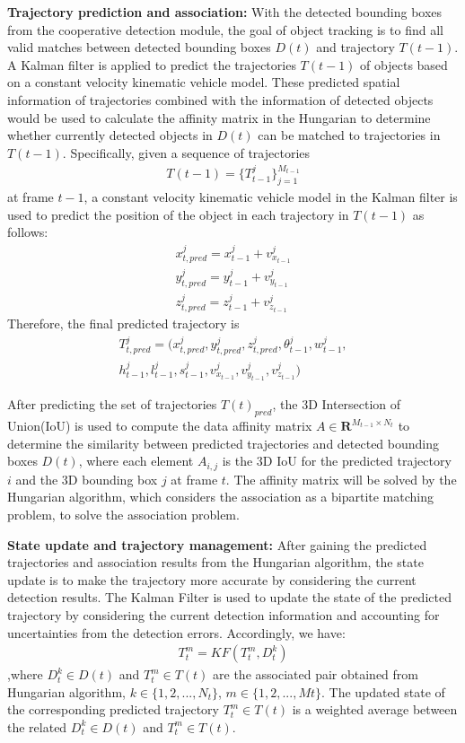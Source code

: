 \documentclass[10pt,twocolumn,letterpaper]{article}
\begin{document}
\textbf{Trajectory prediction and association:} With the detected bounding boxes from the cooperative detection module, the goal of object tracking is to find all valid matches between detected bounding boxes $D(t)$ and trajectory $T(t-1)$. A Kalman filter is applied to predict the trajectories $T(t-1)$ of objects based on a constant velocity kinematic vehicle model. These predicted spatial information of trajectories combined with the information of detected objects would be used to calculate the affinity matrix in the Hungarian to determine whether currently detected objects in $D(t)$ can be matched to trajectories in $T(t-1)$. Specifically, given a sequence of trajectories 
\begin{align}
T(t-1) = \{T_{t-1}^j\}_{j=1}^{M_{t-1}}
\end{align} 
at frame $t-1$, a constant velocity kinematic vehicle model in the Kalman filter is used to predict the position of the object in each trajectory in $T(t-1)$ as follows:
\begin{align}
x_{t,pred}^j = x_{t-1}^j + v_{x_{t-1}}^j \\
y_{t,pred}^j = y_{t-1}^j + v_{y_{t-1}}^j \\
z_{t,pred}^j = z_{t-1}^j + v_{z_{t-1}}^j
\end{align} 
Therefore, the final predicted trajectory is
\begin{align}
T_{t,pred}^j = (x_{t,pred}^j , y_{t,pred}^j , z_{t,pred}^j , \theta_{t-1}^j ,w_{t-1}^j,\\ h_{t-1}^j , l_{t-1}^j , s_{t-1}^j,v_{x_{t-1}}^j, v_{y_{t-1}}^j, v_{z_{t-1}}^j)
\end{align}

After predicting the set of trajectories $T(t)_{pred}$, the 3D Intersection of Union(IoU) is used to compute the data affinity matrix  $A \in \mathbf{R}^ {M_{t-1} \times N_{t}}$ to determine the similarity between predicted trajectories and detected bounding boxes $D(t)$, where each element $A_{i,j}$ is the 3D IoU for the predicted trajectory $i$ and the 3D bounding box $j$ at frame $t$. The affinity matrix will be solved by the Hungarian algorithm, which considers the association as a bipartite matching problem, to solve the association problem. 

\textbf{State update and trajectory management:} After gaining the predicted trajectories and association results from the Hungarian algorithm, the state update is to make the trajectory more accurate by considering the current detection results. The Kalman Filter is used to update the state of the predicted trajectory by considering the current detection information and accounting for uncertainties from the detection errors. Accordingly, we have: 
\begin{align}
T_{t}^{m} = KF(T_{t}^{m}, D_{t}^k)
\end{align}
,where $D_{t}^k \in D(t)$ and $T_{t}^{m} \in T(t)$ are the associated pair obtained from Hungarian algorithm, $k \in \{1, 2, ..., N_{t}\}$, $m \in \{1, 2, ..., M{t}\}$. The updated state of the corresponding predicted trajectory $T_{t}^{m} \in T(t)$ is a weighted average between the related $D_{t}^k \in D(t)$ and $T_{t}^{m} \in T(t)$.
\end{document}
